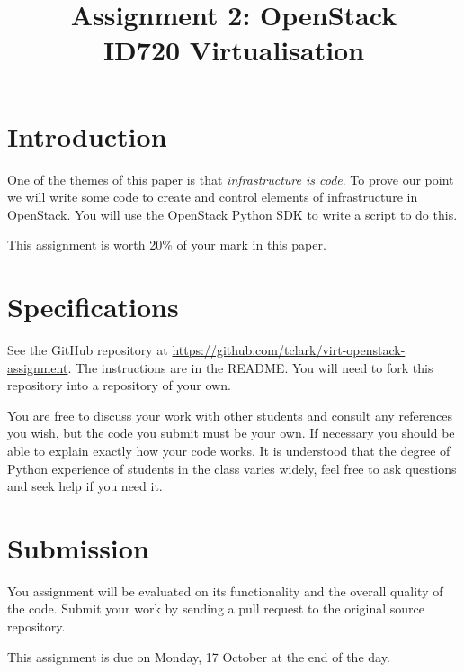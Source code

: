 \documentclass{article}
\begin{document}
\title{Assignment 2: OpenStack \\ ID720 Virtualisation}
\date{}
\maketitle

\section*{Introduction}
One of the themes of this paper is that \emph{infrastructure is code}. To prove our point we will write some code to create and control elements of infrastructure in OpenStack. You will use the OpenStack Python SDK to write a script to do this.

This assignment is worth 20\% of your mark in this paper.

\section{Specifications}
See the GitHub repository at \url{https://github.com/tclark/virt-openstack-assignment}. The instructions are in the README. You will need to fork this repository into a repository of your own.

You are free to discuss your work with other students and consult any references you wish, but the code you submit must be your own. If necessary you should be able to explain exactly how your code works. It is understood that the degree of Python experience of students in the class varies widely, feel free to ask questions and seek help if you need it.

\section{Submission}
You assignment will be evaluated on its functionality and the overall quality of the code. Submit your work by sending a pull request to the original source repository.

This assignment is due on Monday, 17 October at the end of the day.  
\end{document}

